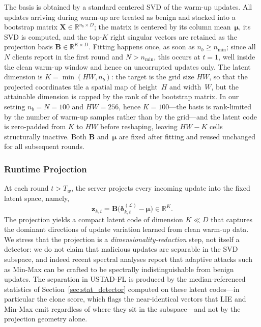 \documentclass[journal]{IEEEtran}
\begin{document}
The basis is obtained by a standard centered SVD of the warm-up updates. All updates arriving during warm-up are treated as benign and stacked into a bootstrap matrix $\mathbf{X} \in \mathbb{R}^{n_b \times D}$; the matrix is centered by its column mean~$\boldsymbol{\mu}$, its SVD is computed, and the top-$K$ right singular vectors are retained as the projection basis $\mathbf{B} \in \mathbb{R}^{K \times D}$. Fitting happens once, as soon as $n_b \geq n_{\min}$; since all $N$ clients report in the first round and $N > n_{\min}$, this occurs at $t = 1$, well inside the clean warm-up window and hence on uncorrupted updates only. The latent dimension is $K = \min(HW, n_b)$: the target is the grid size $HW$, so that the projected coordinates tile a spatial map of height~$H$ and width~$W$, but the attainable dimension is capped by the rank of the bootstrap matrix. In our setting $n_b = N = 100$ and $HW = 256$, hence $K = 100$---the basis is rank-limited by the number of warm-up samples rather than by the grid---and the latent code is zero-padded from $K$ to $HW$ before reshaping, leaving $HW - K$ cells structurally inactive. Both $\mathbf{B}$ and~$\boldsymbol{\mu}$ are fixed after fitting and reused unchanged for all subsequent rounds.

\subsubsection{Runtime Projection}
At each round $t > T_w$, the server projects every incoming update into the fixed latent space, namely,
\begin{equation}
\mathbf{z}_{k,t} = \mathbf{B}\bigl(\boldsymbol{\delta}_{k,t}^{(\mathcal{L})} - \boldsymbol{\mu}\bigr) \in \mathbb{R}^K.
\label{eq:projection}
\end{equation}
The projection yields a compact latent code of dimension $K \ll D$ that captures the dominant directions of update variation learned from clean warm-up data. We stress that the projection is a \emph{dimensionality-reduction} step, not itself a detector: we do not claim that malicious updates are separable in the SVD subspace, and indeed recent spectral analyses report that adaptive attacks such as Min-Max can be crafted to be spectrally indistinguishable from benign updates. The separation in USTAD-FL is produced by the median-referenced statistics of Section~\ref{sec:stat_detector} computed on these latent codes---in particular the clone score, which flags the near-identical vectors that LIE and Min-Max emit regardless of where they sit in the subspace---and not by the projection geometry alone.
\end{document}
